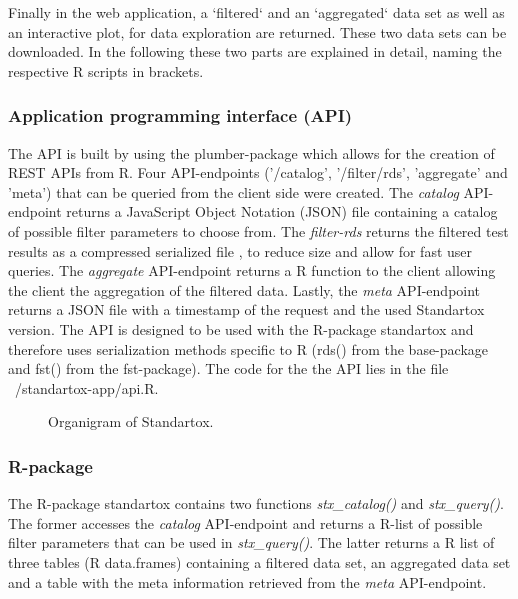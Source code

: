 Finally in the web application, a `filtered` and an `aggregated` data set as well as an interactive plot, for data exploration are returned. These two data sets can be downloaded. In the following these two parts are explained in detail, naming the respective R scripts in brackets.

\subsubsection*{Application programming interface (API)}
The API is built by using the plumber-package \citep{trestletechnologyllc_plumber_2018} which allows for the creation of REST APIs from R. Four API-endpoints ('/catalog', '/filter/rds', 'aggregate' and 'meta') that can be queried from the client side were created. The \textit{catalog} API-endpoint returns a JavaScript Object Notation (JSON) file containing a catalog of possible filter parameters to choose from. The \textit{filter-rds} returns the filtered test results as a compressed serialized file \citep{klik_fst_2019}, to reduce size and allow for fast user queries. The \textit{aggregate} API-endpoint returns a R function to the client allowing the client the aggregation of the filtered data. Lastly, the \textit{meta} API-endpoint returns a JSON file with a timestamp of the request and the used Standartox version. The API is designed to be used with the R-package standartox and therefore uses serialization methods specific to R (rds() from the base-package and fst() from the fst-package). The code for the the API lies in the file ~/standartox-app/api.R.

\begin{figure}
    
    \caption{Organigram of Standartox.}
    \label{fig:stx-organigram}
\end{figure}


\subsubsection*{R-package}
The R-package standartox contains two functions \textit{stx\_catalog()} and \textit{stx\_query()}. The former accesses the \textit{catalog} API-endpoint and returns a R-list of possible filter parameters that can be used in \textit{stx\_query()}. The latter returns a R list of three tables (R data.frames) containing a filtered data set, an aggregated data set and a table with the meta information retrieved from the \textit{meta} API-endpoint.

